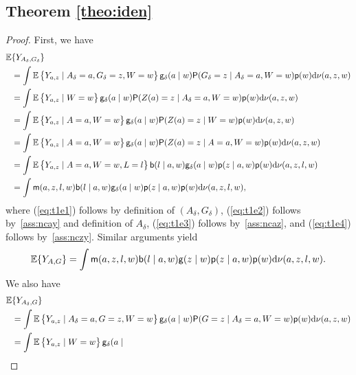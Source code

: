 \subsection{Theorem \ref{theo:iden}}
\begin{proof}
  First, we have
  \begin{align}
    \mathbb{E}&\{Y_{A_\delta, G_\delta}\} \notag\\&= \int \mathbb{E}\left\{Y_{a,z}\mid
                                            A_\delta=a,G_\delta = z,
                                            W=w\right\}\mathsf{g}_\delta(a\mid
                                            w)\mathsf{P}(G_\delta=z\mid
                                            A_\delta=a,W=w)\mathsf{p}(w)\mathrm{d}\nu(a,z,w)\notag\\
      &= \int \mathbb{E}\left\{Y_{a,z}\mid W=w\right\}\mathsf{g}_\delta(a\mid
        w)\mathsf{P}(Z(a)=z\mid
        A_\delta=a,W=w)\mathsf{p}(w)\mathrm{d}\nu(a,z,w)\label{eq:t1e1}\\
      &= \int \mathbb{E}\left\{Y_{a,z}\mid A=a,W=w\right\}\mathsf{g}_\delta(a\mid
        w)\mathsf{P}(Z(a)=z\mid W=w)\mathsf{p}(w)\mathrm{d}\nu(a,z,w)\label{eq:t1e2}\\
      &= \int \mathbb{E}\left\{Y_{a,z}\mid A=a,W=w\right\}\mathsf{g}_\delta(a\mid
        w)\mathsf{P}(Z(a)=z\mid A=a,W=w)\mathsf{p}(w)\mathrm{d}\nu(a,z,w)\label{eq:t1e3}\\
      &= \int \mathbb{E}\left\{Y_{a,z}\mid A=a,W=w,L=l\right\}\mathsf{b}(l\mid a,w)\mathsf{g}_\delta(a\mid
        w)\mathsf{p}(z\mid a,w)\mathsf{p}(w)\mathrm{d}\nu(a,z,l,w)\notag\\
      &= \int \mathsf{m}(a,z,l,w)\mathsf{b}(l\mid a,w)\mathsf{g}_\delta(a\mid
        w)\mathsf{p}(z\mid a,w)\mathsf{p}(w)\mathrm{d}\nu(a,z,l,w)\label{eq:t1e4},
  \end{align}
  where (\ref{eq:t1e1}) follows by definition of $(A_\delta,G_\delta)$,
  (\ref{eq:t1e2}) follows by~\ref{ass:ncay} and definition of
  $A_\delta$, (\ref{eq:t1e3}) follows by~\ref{ass:ncaz}, and
  (\ref{eq:t1e4}) follows by~\ref{ass:nczy}. Similar arguments yield
  \[\mathbb{E}\{Y_{A, G}\}=\int \mathsf{m}(a,z,l,w)\mathsf{b}(l\mid a,w)\mathsf{g}(z\mid
    w)\mathsf{p}(z\mid a,w)\mathsf{p}(w)\mathrm{d}\nu(a,z,l,w).\]
  We also have
  \begin{align*}
    \E&\{Y_{A_\delta, G}\} \notag\\&= \int \E\left\{Y_{a,z}\mid
                                     A_\delta=a,G = z,
                                     W=w\right\}\g_\delta(a\mid
                                     w)\P(G=z\mid
                                     A_\delta=a,W=w)\p(w)\dd\nu(a,z,w)\notag\\
      &= \int \E\left\{Y_{a,z}\mid W=w\right\}\g_\delta(a\mid

\end{align*}
\end{proof}
